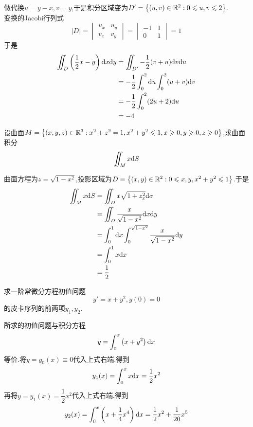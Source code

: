 \documentclass{ctexart}
\begin{document}
\begin{solution}
    做代换$u=y-x,v=y$,于是积分区域变为$D'=\left\{(u,v)\in\mathbb{R}^2:0\leqslant u,v\leqslant 2\right\}$.\\
    变换的Jacobi行列式
    \[\left|D\right|=\begin{vmatrix}
        u_x&u_y\\v_x&v_y
    \end{vmatrix}=\begin{vmatrix}
        -1&1\\0&1
    \end{vmatrix}=1\]
    于是
    \[\begin{aligned}
        \iint_{D}\left(\dfrac12x-y\right)\mathrm{d} x\mathrm{d} y
        &= \iint_{D'}-\dfrac12(v+u)\mathrm{d} v\mathrm{d} u \\
        &= -\dfrac12\int_0^2\mathrm{d} u\int_0^2(u+v)\mathrm{d} v \\
        &= -\dfrac12\int_0^2(2u+2)\mathrm{d} u \\
        &= -4
    \end{aligned}\]

\end{solution}
\begin{problem}[4.(10\songti{分})]
    设曲面$M=\left\{(x,y,z)\in\mathbb{R}^3:x^2+z^2=1,x^2+y^2\leqslant1,x\geqslant0,y\geqslant0,z\geqslant0\right\}$,求曲面积分
        \[\iint_{M}x\mathrm{d} S\]
        
\end{problem}
\begin{solution}
    曲面方程为$z=\sqrt{1-x^2}$,投影区域为$D=\left\{(x,y)\in\mathbb{R}^2:0\leqslant x,y,x^2+y^2\leqslant 1\right\}$.于是
    \[\begin{aligned}
        \iint_{M}x\mathrm{d} S
        &= \iint_{D}x\sqrt{1+z_x^2}\mathrm{d}\sigma \\
        &= \iint_{D}\dfrac{x}{\sqrt{1-x^2}}\mathrm{d} x\mathrm{d} y \\
        &= \int_0^1\mathrm{d} x\int_0^{\sqrt{1-x^2}}\dfrac{x}{\sqrt{1-x^2}}\mathrm{d} y \\
        &= \int_0^1x\mathrm{d} x \\
        &= \dfrac12
    \end{aligned}\]

\end{solution}
\begin{problem}[5.(10\songti{分})]
    求一阶常微分方程初值问题
        \[y'=x+y^2,y(0)=0\]
        的皮卡序列的前两项$y_1,y_2$.
\end{problem}
\begin{solution}
    所求的初值问题与积分方程
    \[y=\int_0^x\left(x+y^2\right)\mathrm{d} x\]
    等价.将$y=y_0(x)\equiv0$代入上式右端,得到
    \[y_1(x)=\int_0^xx\mathrm{d} x=\dfrac12x^2\]
    再将$y=y_1(x)=\dfrac12x^2$代入上式右端,得到
    \[y_2(x)=\int_0^x\left(x+\dfrac14x^4\right)\mathrm{d} x=\dfrac12x^2+\dfrac{1}{20}x^5\]

\end{solution}
\end{document}
